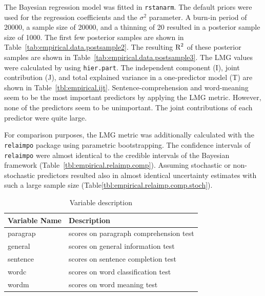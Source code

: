 \documentclass[11pt,a4paper,twoside]{book}
\begin{document}
The Bayesian regression model was fitted in \texttt{rstanarm}. The default priors were used for the regression coefficients and the $\sigma^2$ parameter. A burn-in period of 20000, a sample size of 20000, and a thinning of 20 resulted in a posterior sample size of 1000. The first few posterior samples are shown in Table~\ref{tab:empirical.data.postsample2}. The resulting $\text{R}^2$ of these posterior samples are shown in Table~\ref{tab:empirical.data.postsample3}. The LMG values were calculated by using \texttt{hier.part}. The  independent component (I), joint contribution (J), and total explained variance in a one-predictor model (T) are shown in Table~\ref{tbl:empirical.ijt}. Sentence-comprehension and word-meaning seem to be the most important predictors by applying the LMG metric. However, none of the predictors seem to be unimportant.  The joint contributions of each predictor were quite large.

For comparison purposes, the LMG metric was additionally calculated with the \texttt{relaimpo} package using parametric bootstrapping. The confidence intervals of  \texttt{relaimpo} were almost identical to the credible intervals of the Bayesian framework (Table~\ref{tbl:empirical.relaimp.comp}). Assuming stochastic or non-stochastic predictors resulted also in almost identical uncertainty estimates with such a large sample size (Table\ref{tbl:empirical.relaimp.comp.stoch}). 







\begin{table}
\centering
\caption{Variable description}
\begin{tabular}{l l}
  \toprule			
  Variable Name & Description  \\   \midrule  
  paragrap & scores on paragraph comprehension test  \\
  general & scores on general information test \\
  sentence & scores on sentence completion test\\
  wordc & scores on word classification test \\
  wordm & scores on word meaning test \\
  \bottomrule  
\end{tabular}
\label{table:hs.data}
\end{table}
\end{document}
